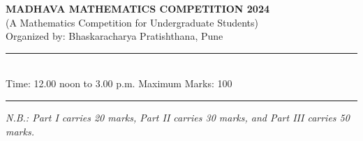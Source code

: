 \documentclass[11pt,a4paper]{article}
\begin{document}
\begin{center}
  {\large\bfseries MADHAVA MATHEMATICS COMPETITION 2024}\\[2pt]
  {\normalsize (A Mathematics Competition for Undergraduate Students)}\\[4pt]
  {\small Organized by: Bhaskaracharya Pratishthana, Pune}\\[6pt]
  \rule{0.8\linewidth}{0.5pt}\\[6pt]
  {\normalsize Time: 12.00 noon to 3.00 p.m. \hfill Maximum Marks: 100}
\end{center}

\rule{\linewidth}{0.4pt}\smallskip



\noindent   \textit{N.B.: Part I carries 20 marks, Part II carries 30 marks, and Part III carries 50 marks.}
\bigskip




\end{document}
